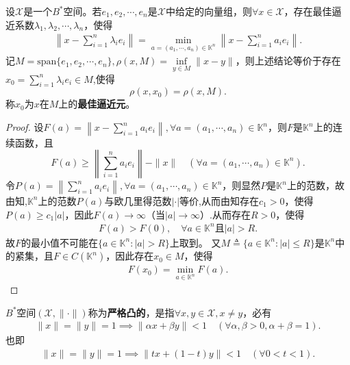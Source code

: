 \documentclass[../../main.tex]{subfiles}%
\begin{document}
\begin{theorem}\label{theorem:最佳逼近元的存在性}
设$\mathscr{X}$是一个$B^*$空间。若$e_1,e_2,\cdots,e_n$是$\mathscr{X}$中给定的向量组，则$\forall x \in \mathscr{X}$，存在最佳逼近系数$\lambda_1,\lambda_2,\cdots,\lambda_n$，使得
\begin{align*}
\left\| x-\sum_{i=1}^n{\lambda _ie_i} \right\| =\min_{a=\left( a_1,\cdots ,a_n \right) \in \mathbb{K} ^n} \left\| x-\sum_{i=1}^n{a_ie_i} \right\| .
\end{align*}
记$M = \text{span}\{e_1,e_2,\cdots,e_n\}, \rho(x,M) = \inf\limits_{y \in M} \|x-y\|$，则上述结论等价于存在$x_0 = \sum\limits_{i=1}^n \lambda_i e_i\in M$,使得
$$\rho(x,x_0) = \rho(x,M).$$
称$x_0$为$x$在$M$上的\textbf{最佳逼近元}。
\end{theorem}
\begin{proof}

设$F(a) = \left\| x - \sum\limits_{i=1}^n a_i e_i \right\| ,\forall a =(a_1,\cdots,a_n)\in \mathbb{K}^n$，则$F$是$\mathbb{K}^n$上的连续函数，且
$$F(a) \geqslant \left\| \sum\limits_{i=1}^n a_i e_i \right\| - \|x\| \quad (\forall a=(a_1,\cdots,a_n) \in \mathbb{K}^n).$$
令$P(a) = \left\| \sum\limits_{i=1}^n a_i e_i \right\|,\forall a =(a_1,\cdots,a_n)\in \mathbb{K}^n$，则显然$P$是$\mathbb{K}^n$上的范数，故由知,$\mathbb{K}^n$上的范数$P(a)$与欧几里得范数$|\cdot|$等价,从而由知存在$c_1>0$，使得$P(a) \geqslant c_1 |a|$，因此$F(a) \to \infty$（当$|a| \to \infty$）.从而存在$R>0$，使得
\begin{align*}
F(a) > F(0), \quad \forall a\in \mathbb{K}^n \text{且} |a|>R.
\end{align*}
故$F$的最小值不可能在$\{ a\in \mathbb{K}^n:|a|>R \}$上取到。
又$M\triangleq \{ a\in \mathbb{K}^n:|a|\leqslant R \}$是$\mathbb{K}^n$中的紧集，且$F\in C(\mathbb{K}^n)$，因此存在$x_0\in M$，使得
\begin{align*}
F(x_0) = \min\limits_{a\in \mathbb{K}^n} F(a).
\end{align*}

\end{proof}

\begin{definition}[严格凸的]
$B^*$空间$(\mathscr{X},\|\cdot\|)$称为\textbf{严格凸的}，是指$\forall x,y \in \mathscr{X}, x \neq y$，必有
\begin{align*}
\|x\| = \|y\| = 1 \implies \|\alpha x + \beta y\| < 1 \quad (\forall \alpha,\beta>0, \alpha+\beta=1).
\end{align*}
也即
\begin{align*}
\|x\| = \|y\| = 1 \implies \|t x + (1-t) y\| < 1 \quad (\forall 0<t<1).
\end{align*}
\end{definition}
\end{document}
